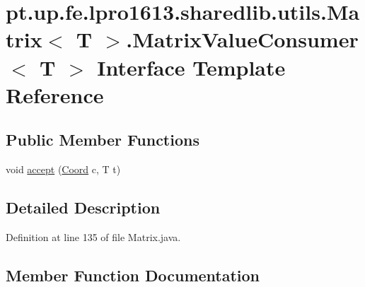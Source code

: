 \hypertarget{interfacept_1_1up_1_1fe_1_1lpro1613_1_1sharedlib_1_1utils_1_1_matrix_1_1_matrix_value_consumer}{}\section{pt.\+up.\+fe.\+lpro1613.\+sharedlib.\+utils.\+Matrix$<$ T $>$.Matrix\+Value\+Consumer$<$ T $>$ Interface Template Reference}
\label{interfacept_1_1up_1_1fe_1_1lpro1613_1_1sharedlib_1_1utils_1_1_matrix_1_1_matrix_value_consumer}
\subsection*{Public Member Functions}
\begin{DoxyCompactItemize}
\item 
void \hyperlink{interfacept_1_1up_1_1fe_1_1lpro1613_1_1sharedlib_1_1utils_1_1_matrix_1_1_matrix_value_consumer_a0a8464f855575d97d91288a99912f272}{accept} (\hyperlink{classpt_1_1up_1_1fe_1_1lpro1613_1_1sharedlib_1_1utils_1_1_coord}{Coord} c, T t)
\end{DoxyCompactItemize}


\subsection{Detailed Description}


Definition at line 135 of file Matrix.\+java.



\subsection{Member Function Documentation}
\hypertarget{interfacept_1_1up_1_1fe_1_1lpro1613_1_1sharedlib_1_1utils_1_1_matrix_1_1_matrix_value_consumer_a0a8464f855575d97d91288a99912f272}{}\label{interfacept_1_1up_1_1fe_1_1lpro1613_1_1sharedlib_1_1utils_1_1_matrix_1_1_matrix_value_consumer_a0a8464f855575d97d91288a99912f272} 
